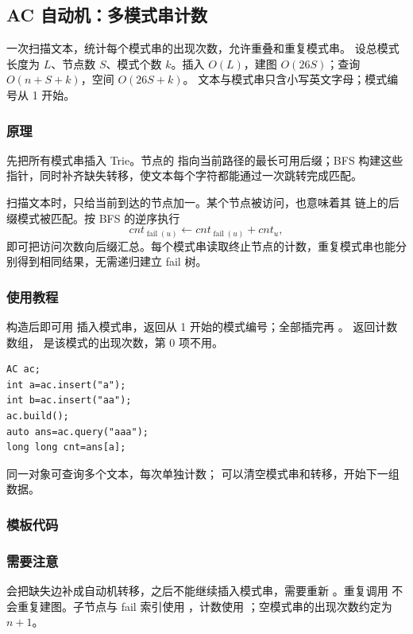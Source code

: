 \subsection{AC 自动机：多模式串计数}
\label{algo:ac-automaton}
\AlgorithmInfo
    {一次扫描文本，统计每个模式串的出现次数，允许重叠和重复模式串。}
    {设总模式长度为 $L$、节点数 $S$、模式个数 $k$。插入 $O(L)$，建图 $O(26S)$；查询 $O(n+S+k)$，空间 $O(26S+k)$。}
    {文本与模式串只含小写英文字母；模式编号从 1 开始。}

\subsubsection*{原理}
先把所有模式串插入 Trie。节点的  指向当前路径的最长可用后缀；BFS 构建这些指针，同时补齐缺失转移，使文本每个字符都能通过一次跳转完成匹配。

扫描文本时，只给当前到达的节点加一。某个节点被访问，也意味着其  链上的后缀模式被匹配。按 BFS 的逆序执行
\[
    cnt_{\operatorname{fail}(u)}\gets cnt_{\operatorname{fail}(u)}+cnt_u,
\]
即可把访问次数向后缀汇总。每个模式串读取终止节点的计数，重复模式串也能分别得到相同结果，无需递归建立 fail 树。

\subsubsection*{使用教程}
构造后即可用  插入模式串，返回从 1 开始的模式编号；全部插完再 。 返回计数数组， 是该模式的出现次数，第 0 项不用。
\begin{lstlisting}[style=mtycpp,numbers=none]
AC ac;
int a=ac.insert("a");
int b=ac.insert("aa");
ac.build();
auto ans=ac.query("aaa");
long long cnt=ans[a];
\end{lstlisting}
同一对象可查询多个文本，每次单独计数； 可以清空模式串和转移，开始下一组数据。

\subsubsection*{模板代码}

\subsubsection*{需要注意}
 会把缺失边补成自动机转移，之后不能继续插入模式串，需要重新 。重复调用  不会重复建图。子节点与 fail 索引使用 ，计数使用 ；空模式串的出现次数约定为 $n+1$。
